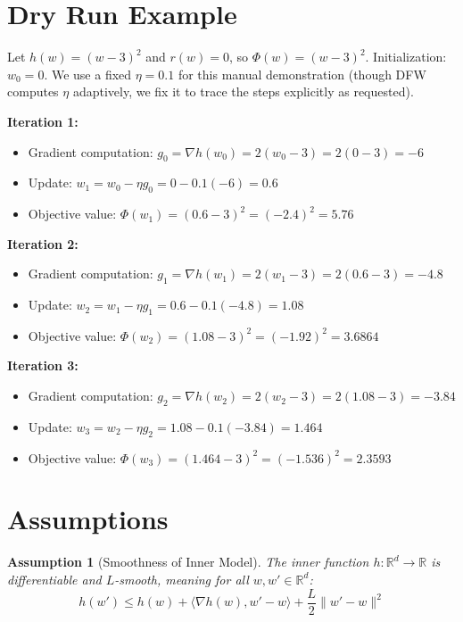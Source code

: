 \documentclass{article}
\newtheorem{assumption}{Assumption}
\begin{document}
\section*{Dry Run Example}
Let $h(w) = (w-3)^2$ and $r(w) = 0$, so $\Phi(w) = (w-3)^2$. 
Initialization: $w_0 = 0$. We use a fixed $\eta = 0.1$ for this manual demonstration (though DFW computes $\eta$ adaptively, we fix it to trace the steps explicitly as requested).

\textbf{Iteration 1:}
\begin{itemize}
    \item Gradient computation: $g_0 = \nabla h(w_0) = 2(w_0 - 3) = 2(0 - 3) = -6$
    \item Update: $w_1 = w_0 - \eta g_0 = 0 - 0.1(-6) = 0.6$
    \item Objective value: $\Phi(w_1) = (0.6 - 3)^2 = (-2.4)^2 = 5.76$
\end{itemize}

\textbf{Iteration 2:}
\begin{itemize}
    \item Gradient computation: $g_1 = \nabla h(w_1) = 2(w_1 - 3) = 2(0.6 - 3) = -4.8$
    \item Update: $w_2 = w_1 - \eta g_1 = 0.6 - 0.1(-4.8) = 1.08$
    \item Objective value: $\Phi(w_2) = (1.08 - 3)^2 = (-1.92)^2 = 3.6864$
\end{itemize}

\textbf{Iteration 3:}
\begin{itemize}
    \item Gradient computation: $g_2 = \nabla h(w_2) = 2(w_2 - 3) = 2(1.08 - 3) = -3.84$
    \item Update: $w_3 = w_2 - \eta g_2 = 1.08 - 0.1(-3.84) = 1.464$
    \item Objective value: $\Phi(w_3) = (1.464 - 3)^2 = (-1.536)^2 = 2.3593$
\end{itemize}

\section*{Assumptions}
\begin{assumption}[Smoothness of Inner Model]
The inner function $h: \mathbb{R}^d \to \mathbb{R}$ is differentiable and $L$-smooth, meaning for all $w, w' \in \mathbb{R}^d$:
\begin{equation}
    h(w') \leq h(w) + \langle \nabla h(w), w' - w \rangle + \frac{L}{2} \|w' - w\|^2
\end{equation}
\end{assumption}
\end{document}
